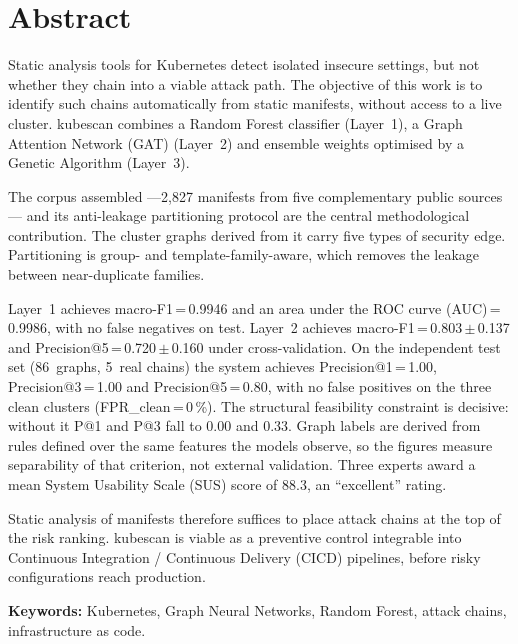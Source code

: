 \chapter{Abstract}

Static analysis tools for Kubernetes detect isolated insecure settings,
but not whether they chain into a viable attack path. The objective of this work
is to identify such chains automatically from static manifests, without access
to a live cluster. kubescan combines a Random Forest classifier
(Layer~1), a Graph Attention Network (\acs{GAT}) (Layer~2) and
ensemble weights optimised by a Genetic Algorithm (Layer~3).

The corpus assembled —2,827 manifests from five complementary public sources—
and its anti-leakage partitioning protocol are the central methodological
contribution. The cluster graphs derived from it carry five types of security
edge. Partitioning is group- and template-family-aware, which
removes the leakage between near-duplicate families.

Layer~1 achieves macro-F1\,=\,0.9946 and an area under the ROC curve
(\acs{AUC})\,=\,0.9986, with no false negatives on test. Layer~2 achieves
macro-F1\,=\,0.803\,\(\pm\)\,0.137 and Precision@5\,=\,0.720\,\(\pm\)\,0.160
under cross-validation. On the independent test set (86~graphs, 5~real chains)
the system achieves Precision@1\,=\,1.00, Precision@3\,=\,1.00 and
Precision@5\,=\,0.80, with no false positives on the three clean clusters
(\acs{FPR}\_clean\,=\,0\,\%). The structural
feasibility constraint is decisive: without it P@1 and P@3 fall to 0.00 and
0.33. Graph labels are derived from rules defined over the same features the
models observe, so the figures measure separability of that criterion, not
external validation. Three experts award a mean System Usability Scale (\acs{SUS}) score of
88.3, an ``excellent'' rating.

Static analysis of manifests therefore suffices to place attack chains at the
top of the risk ranking. kubescan is viable as a preventive control
integrable into Continuous Integration / Continuous Delivery (\acs{CICD})
pipelines, before risky configurations reach production.

\medskip
\noindent\textbf{Keywords:} Kubernetes, Graph Neural Networks, Random Forest,
attack chains, infrastructure as code.
